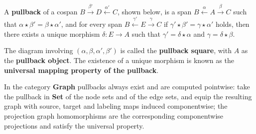 \begin{definition} 
    \label{def:cat:pb}
   A \textbf{pullback} of a cospan \(B \overset{\beta'}{\rightarrow} D \overset{\alpha'}{\leftarrow} C \), shown below,
is a span \( B \overset{\alpha}{\leftarrow} A \overset{\beta}{\rightarrow} C \) such that \( \alpha \star \beta' = \beta \star \alpha' \), and for every span \( B \overset{\gamma'}{\leftarrow} E \overset{\gamma}{\rightarrow} C \) if \(\gamma' \star \beta' = \gamma \star \alpha'\) holds, then there exists a unique morphism \(\delta: E \to A\) such that $\gamma' = \delta \star \alpha$ and $\gamma = \delta \star \beta$. 
    \begin{center}
                \end{center}
The diagram involving \( (\alpha, \beta, \alpha', \beta') \) is called the \textbf{pullback square}, with \(A\) as the \textbf{pullback object}. The existence of a unique morphism is known as the \textbf{universal mapping property of the pullback}.
\end{definition} 
In the category \textbf{Graph} pullbacks always exist and are computed pointwise: take the pullback in \textbf{Set} of the node sets and of the edge sets, and equip the resulting graph with source, target and labeling maps induced componentwise; the projection graph homomorphisms are the corresponding componentwise projections and satisfy the universal property.
